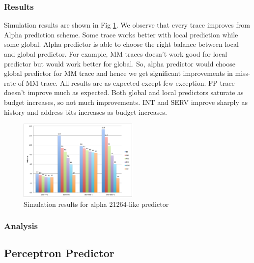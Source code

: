 \documentclass[conference]{IEEEtran}
\begin{document}
\subsubsection{Results}
Simulation results are shown in Fig \ref{results_alpha}. We observe that every trace improves from Alpha prediction scheme. Some trace works better with local prediction while some global. Alpha predictor is able to choose the right balance between local and global predictor. For example, MM traces doesn't work good for local predictor but would work better for global. So, alpha predictor would choose global predictor for MM trace and hence we get significant improvements in miss-rate of MM trace. All results are as expected except few exception. FP trace doesn't improve much as expected. Both global and local predictors saturate as budget increases, so not much improvements. INT and SERV improve sharply as history and address bits increases as budget increases.  
\begin{figure}[!t]
    \centering
    \includegraphics[width=2.3in]{alpha}
    \caption{Simulation results for alpha 21264-like predictor}
    \label{results_alpha}
\end{figure}

\subsubsection{Analysis}

\subsection{Perceptron Predictor}
\end{document}
